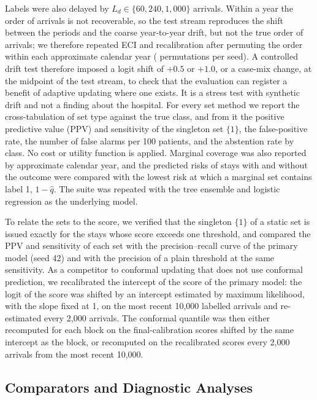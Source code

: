 Labels were also delayed by $L_d \in \{60, 240, 1{,}000\}$ arrivals. Within a year the order of
arrivals is not recoverable, so the test stream reproduces the shift between the periods and the coarse year-to-year drift, but not the true order of arrivals; we
therefore repeated ECI and recalibration after permuting the order within each approximate calendar year (\RVStreamPerm{} permutations per seed). A controlled
drift test therefore imposed a logit shift of $+0.5$ or $+1.0$, or a case-mix change, at the midpoint of the test stream, to check that the evaluation can register a benefit
of adaptive updating where one exists. It is a stress test with synthetic drift and not a finding about the hospital.
For every set method we report the cross-tabulation of set type against the true class, and from it the positive predictive value (PPV) and sensitivity of the
singleton set $\{1\}$, the false-positive rate, the number of false alarms per 100 patients, and the abstention rate by class. No cost or utility function is
applied. Marginal coverage was also reported by approximate calendar year, and the predicted risks of stays with and without the outcome were compared with the
lowest risk at which a marginal set contains label 1, $1-\hat{q}$. The suite was repeated with the tree ensemble and logistic regression as the underlying model.

To relate the sets to the score, we verified that the singleton $\{1\}$ of a static set is issued exactly for the stays whose score exceeds one threshold, and compared the PPV and sensitivity of each set with the precision--recall curve of the primary model (seed 42) and with the precision of a plain threshold at the same sensitivity. As a competitor to conformal updating that does not use conformal prediction, we recalibrated the intercept of the score of the primary model: the logit of the score was shifted by an intercept estimated by maximum likelihood, with the slope fixed at 1, on the most recent 10{,}000 labelled arrivals and re-estimated every 2{,}000 arrivals. The conformal quantile was then either recomputed for each block on the final-calibration scores shifted by the same intercept as the block, or recomputed on the recalibrated scores every 2{,}000 arrivals from the most recent 10{,}000.

\subsection{Comparators and Diagnostic Analyses}
\label{sec:methods-diagnostics}

